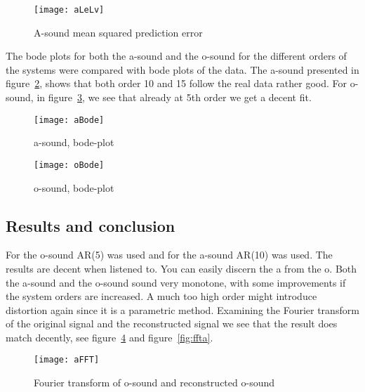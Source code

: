 \documentclass[10pt]{article}
\begin{document}
\begin{figure}[!hp]

    \begin{center}
      \texttt{[image: aLeLv]}
    \caption{A-sound mean squared prediction error \label{fig:aLeLv}}
    \end{center}

\end{figure}

The bode plots for both the a-sound and the o-sound for the different orders of
the systems were compared with bode plots of the data. The a-sound presented in
figure~\ref{fig:aBode}, shows that both order 10 and 15 follow the real data
rather good. For o-sound, in figure~\ref{fig:oBode}, we see that already at
5th order we get a decent fit.


\begin{figure}[!hp]

    \begin{center}
      \texttt{[image: aBode]}
    \caption{a-sound, bode-plot \label{fig:aBode}}
    \end{center}

\end{figure}

\begin{figure}[!hp]

    \begin{center}
      \texttt{[image: oBode]}
    \caption{o-sound, bode-plot \label{fig:oBode}}
    \end{center}
\end{figure}

\subsection{Results and conclusion}
For the o-sound AR(5) was used and for the a-sound AR(10) was used.
The results are decent when listened to. You can easily discern the a from the o.
Both the a-sound and the o-sound sound very monotone, with some improvements if
the system orders are increased.
A much too high order might introduce distortion again since it is a parametric method.
Examining the Fourier transform of the original signal and the reconstructed
signal we see that the result does match decently, see figure~\ref{fig:ffto} and
figure~\ref{fig:ffta}.


\begin{figure}[!hp]

    \begin{center}
      \texttt{[image: aFFT]}
    \caption{Fourier transform of o-sound and reconstructed o-sound \label{fig:ffto}}
    \end{center}

\end{figure}
\end{document}
